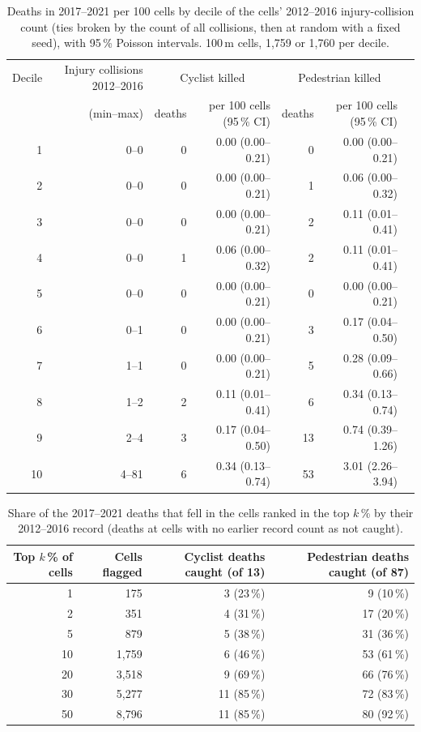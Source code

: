 \begin{table}[htbp]\centering\caption{Deaths in 2017--2021 per 100 cells by decile of the cells’ 2012--2016 injury-collision count (ties broken by the count of all collisions, then at random with a fixed seed), with 95\,\% Poisson intervals. 100\,m cells, 1,759 or 1,760 per decile.}\label{tab:dec}
\footnotesize\begin{tabular}{@{}r r r r r r r@{}}\toprule Decile & Injury collisions 2012--2016 & \multicolumn{2}{c}{Cyclist killed} & \multicolumn{2}{c}{Pedestrian killed}\\ & (min--max) & deaths & per 100 cells (95\,\% CI) & deaths & per 100 cells (95\,\% CI)\\ \midrule
1 & 0--0 & 0 & 0.00 (0.00--0.21) & 0 & 0.00 (0.00--0.21)\\
2 & 0--0 & 0 & 0.00 (0.00--0.21) & 1 & 0.06 (0.00--0.32)\\
3 & 0--0 & 0 & 0.00 (0.00--0.21) & 2 & 0.11 (0.01--0.41)\\
4 & 0--0 & 1 & 0.06 (0.00--0.32) & 2 & 0.11 (0.01--0.41)\\
5 & 0--0 & 0 & 0.00 (0.00--0.21) & 0 & 0.00 (0.00--0.21)\\
6 & 0--1 & 0 & 0.00 (0.00--0.21) & 3 & 0.17 (0.04--0.50)\\
7 & 1--1 & 0 & 0.00 (0.00--0.21) & 5 & 0.28 (0.09--0.66)\\
8 & 1--2 & 2 & 0.11 (0.01--0.41) & 6 & 0.34 (0.13--0.74)\\
9 & 2--4 & 3 & 0.17 (0.04--0.50) & 13 & 0.74 (0.39--1.26)\\
10 & 4--81 & 6 & 0.34 (0.13--0.74) & 53 & 3.01 (2.26--3.94)\\
\bottomrule\end{tabular}\end{table}

\begin{table}[htbp]\centering\caption{Share of the 2017--2021 deaths that fell in the cells ranked in the top $k$\,\% by their 2012--2016 record (deaths at cells with no earlier record count as not caught).}\label{tab:top}
\footnotesize\begin{tabular}{@{}r r r r@{}}\toprule Top $k$\,\% of cells & Cells flagged & Cyclist deaths caught (of 13) & Pedestrian deaths caught (of 87)\\ \midrule
1 & 175 & 3 (23\,\%) & 9 (10\,\%)\\
2 & 351 & 4 (31\,\%) & 17 (20\,\%)\\
5 & 879 & 5 (38\,\%) & 31 (36\,\%)\\
10 & 1,759 & 6 (46\,\%) & 53 (61\,\%)\\
20 & 3,518 & 9 (69\,\%) & 66 (76\,\%)\\
30 & 5,277 & 11 (85\,\%) & 72 (83\,\%)\\
50 & 8,796 & 11 (85\,\%) & 80 (92\,\%)\\
\bottomrule\end{tabular}\end{table}

